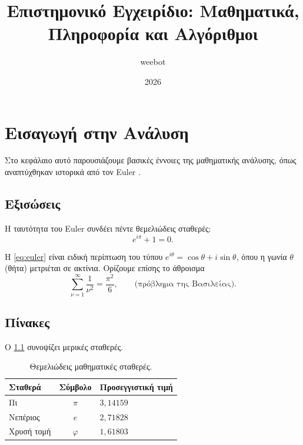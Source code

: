 



\title{Επιστημονικό Εγχειρίδιο: Μαθηματικά, Πληροφορία και Αλγόριθμοι}
\author{weebot}
\date{2026}



\frontmatter
\maketitle
\tableofcontents

\mainmatter

\chapter{Εισαγωγή στην Ανάλυση}
\label{chap:analysis}

Στο κεφάλαιο αυτό παρουσιάζουμε βασικές έννοιες της μαθηματικής ανάλυσης,
όπως αναπτύχθηκαν ιστορικά από τον Euler \autocite{euler1748}.

\section{Εξισώσεις}
\label{sec:equations}

Η ταυτότητα του Euler συνδέει πέντε θεμελιώδεις σταθερές:
\begin{equation}
  e^{i\pi} + 1 = 0 .
  \label{eq:euler}
\end{equation}

Η \cref{eq:euler} είναι ειδική περίπτωση του τύπου $e^{i\theta} = \cos\theta + i\sin\theta$,
όπου η γωνία $\theta$ (θήτα) μετριέται σε ακτίνια. Ορίζουμε επίσης το άθροισμα
\begin{equation}
  \sum_{\nu=1}^{\infty} \frac{1}{\nu^{2}} = \frac{\pi^{2}}{6},
  \qquad \text{(πρόβλημα της Βασιλείας)} .
\end{equation}

\section{Πίνακες}
\label{sec:tables}

Ο \cref{tab:constants} συνοψίζει μερικές σταθερές.

\begin{table}[htbp]
  \centering
  \caption{Θεμελιώδεις μαθηματικές σταθερές.}
  \label{tab:constants}
  \begin{tabular}{@{}lcl@{}}
    \toprule
    Σταθερά & Σύμβολο & Προσεγγιστική τιμή \\
    \midrule
    Πι            & $\pi$ & $3{,}14159$ \\
    Νεπέριος      & $e$   & $2{,}71828$ \\
    Χρυσή τομή    & $\varphi$ & $1{,}61803$ \\
    \bottomrule
  \end{tabular}
\end{table}

